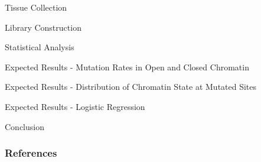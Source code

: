 \documentclass{beamer}
\begin{document}
\begin{frame}{Tissue Collection}
\end{frame}

\begin{frame}{Library Construction}
\end{frame}

\begin{frame}{Statistical Analysis}
\end{frame}

\begin{frame}{Expected Results - Mutation Rates in Open and Closed Chromatin}
\end{frame}

\begin{frame}{Expected Results - Distribution of Chromatin State at Mutated Sites}
\end{frame}

\begin{frame}{Expected Results - Logistic Regression}
\end{frame}

\begin{frame}{Conclusion}
\end{frame}

\begin{frame}[t, allowframebreaks]
\frametitle{References}
\printbibliography
\end{frame}
\end{document}
